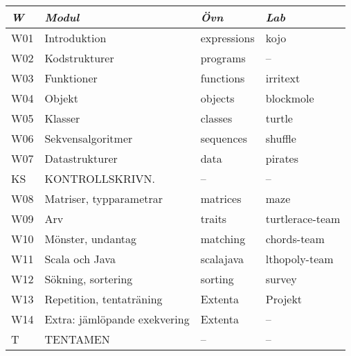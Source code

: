 \begin{tabular}{l|l|l|l}
\textit{W} & \textit{Modul} & \textit{Övn} & \textit{Lab} \\ \hline \hline
W01 & Introduktion & expressions & kojo \\
W02 & Kodstrukturer & programs & -- \\
W03 & Funktioner & functions & irritext \\
W04 & Objekt & objects & blockmole \\
W05 & Klasser & classes & turtle \\
W06 & Sekvensalgoritmer & sequences & shuffle \\
W07 & Datastrukturer & data & pirates \\
KS & KONTROLLSKRIVN. & -- & -- \\
W08 & Matriser, typparametrar & matrices & maze \\
W09 & Arv & traits & turtlerace-team \\
W10 & Mönster, undantag & matching & chords-team \\
W11 & Scala och Java & scalajava & lthopoly-team \\
W12 & Sökning, sortering & sorting & survey \\
W13 & Repetition, tentaträning & Extenta & Projekt \\
W14 & Extra: jämlöpande exekvering & Extenta & -- \\
T & TENTAMEN & -- & -- \\
\end{tabular}
